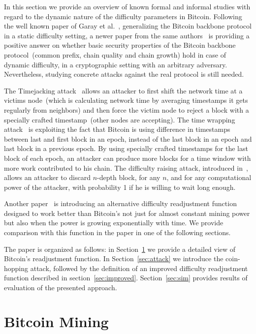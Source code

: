 \documentclass[]{llncs}
\begin{document}
In this section we provide an overview of known formal and informal studies with regard to the dynamic nature of the difficulty parameters in Bitcoin. Following the well known paper of Garay et al.~\cite{garay2015bitcoin}, generalizing the Bitcoin backbone protocol in a static difficulty setting, a newer paper from the same authors~\cite{gkl16} is providing a positive answer on whether basic security properties of the Bitcoin backbone protocol~(common prefix, chain quality and chain growth) hold in case of dynamic difficulty, in a cryptographic setting with an arbitrary adversary. Nevertheless, studying concrete attacks against the real protocol is still needed.      

The Timejacking attack~\cite{timejacking2011} allows an attacker to first shift the network time at a victims node~(which is calculating network time by averaging timestamps it gets regularly from neighbors) and then force the victim node to reject a block with a specially crafted timestamp~(other nodes are accepting). The time wrapping attack~\cite{artforz2011} is exploiting the fact that Bitcoin is using difference in timestamps between last and first block in an epoch, instead of the last block in an epoch and last block in a previous epoch. By using specially crafted timestamps for the last block of each epoch, an attacker can produce more blocks for a time window with more work contributed to his chain. The difficulty raising attack, introduced in~\cite{bahack2013theoretical}, allows an attacker to discard $n$-depth block, for any $n$, and for any computational power of the attacker, with probability 1 if he is willing to wait long enough.

Another paper~\cite{kraft2015difficulty} is introducing an alternative difficulty readjustment function designed to work better than Bitcoin's not just for almost constant mining power but also when the power is growing exponentially with time. We provide comparison with this function in the paper in one of the following sections.  

The paper is organized as follows: in Section~\ref{sec:bit} we provide a detailed view of Bitcoin's readjustment function. In Section~\ref{sec:attack} we introduce the coin-hopping attack, followed by the definition of an improved difficulty readjustment function described in section~\ref{sec:improved}. Section~\ref{sec:sim} provides results of evaluation of the presented approach. 

\section{Bitcoin Mining}
\label{sec:bit}
\end{document}
